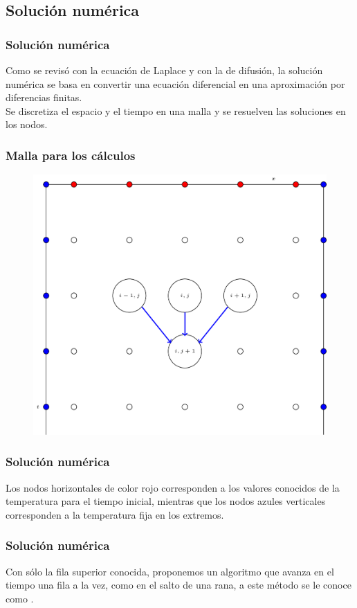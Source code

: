 \documentclass[12pt]{beamer}
\begin{document}
\subsection{Solución numérica}
\begin{frame}
\frametitle{Solución numérica}
Como se revisó con la ecuación de Laplace y con la de difusión, la solución numérica se basa en convertir una ecuación diferencial en una aproximación por diferencias finitas.
\\
\bigskip
Se discretiza el espacio y el tiempo en una malla y se resuelven las soluciones en los nodos.
\end{frame}
\begin{frame}
\frametitle{Malla para los cálculos}
\begin{figure}
	\centering
	\includegraphics[scale=0.15]{Imagenes/malla_parabolica_01.png}
\end{figure}
\end{frame}
\begin{frame}
\frametitle{Solución numérica}
Los nodos horizontales de color rojo corresponden a los valores conocidos de la temperatura para el tiempo inicial, mientras que los nodos azules verticales corresponden a la temperatura fija en los extremos.
\end{frame}
\begin{frame}
\frametitle{Solución numérica}
Con sólo la fila superior conocida, proponemos un algoritmo que avanza en el tiempo una fila a la vez, como en el salto de una rana, a este método se le conoce como .
\end{frame}
\end{document}
